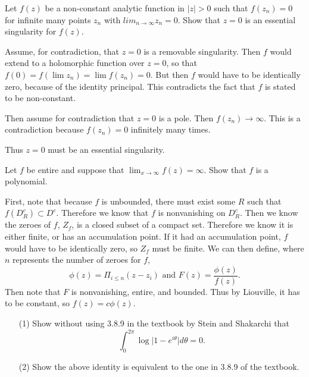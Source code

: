 \documentclass[12pt]{article}
\begin{document}
\begin{statement}[4]
  Let $f(z)$ be a non-constant analytic function in $\vert z \vert > 0$ such that $f(z_n)=0$ for infinite 
  many points $z_n$ with $lim_{n \to \infty}z_n=0$. Show that $z=0$ is an essential singularity for $f(z)$.
\end{statement}
\begin{newproof}
  Assume, for contradiction, that $z=0$ is a removable singularity. Then $f$ would extend to a holomorphic 
  function over $z=0$, so that $f(0)=f(\lim z_n)=\lim f(z_n) = 0$. But then $f$ would have to be identically 
  zero, because of the identity principal. This contradicts the fact that $f$ is stated to be non-constant.
  \par Then assume for contradiction that $z=0$ is a pole. Then $f(z_n) \to \infty$. This is a contradiction
  because $f(z_n)=0$ infinitely many times.
  \par Thus $z=0$ must be an essential singularity. 
\end{newproof}


\begin{statement}[5]
  Let $f$ be entire and suppose that $\lim_{x \to \infty} f(z) = \infty$. Show that $f$ is a polynomial.
\end{statement}
\begin{newproof}
  First, note that because $f$ is unbounded, there must exist some $R$ such that $f(D^c_R) \subset D^c$. 
  Therefore we know that $f$ is nonvanishing on $D^c_R$. Then we know the zeroes of $f$, $Z_f$, is a 
  closed subset of a compact set. Therefore we know it is either finite, or has an accumulation point.
  If it had an accumulation point, $f$ would have to be identically zero, so $Z_f$ must be finite. We can 
  then define, where $n$ represents the number of zeroes for $f$, 
  \begin{equation*}
    \phi (z) = \Pi_{i \leq n} (z-z_i) \text{ and } F(z)= \frac{\phi (z)}{f(z)}.
  \end{equation*}
  Then note that $F$ is nonvanishing, entire, and bounded. Thus by Liouville, it has to be constant, so 
  $f(z)=c \phi(z)$.
\end{newproof}


\begin{statement}[6]
  \begin{itemize}
    \item[(1)] Show without using 3.8.9 in the textbook by Stein and Shakarchi that 
      $$ \int^{2\pi}_0 \log \vert 1 - e^{i \theta} \vert d \theta = 0. $$
    \item[(2)] Show the above identity is equivalent to the one in 3.8.9 of the textbook. 
  \end{itemize}
\end{statement}
\end{document}
